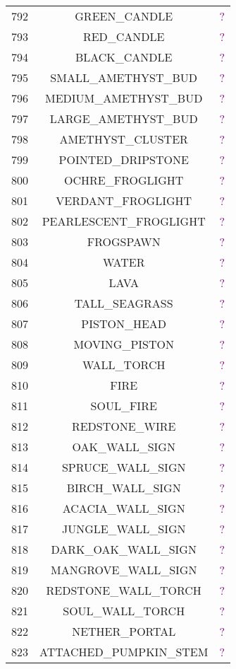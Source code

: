 \documentclass[11pt]{article}
\newcommand\myworries[1]{\textcolor{purple}{#1}}
\begin{document}
\begin{longtable}{ |c|c|c| }
	792 & GREEN\_CANDLE & \myworries{?} \\
	793 & RED\_CANDLE & \myworries{?} \\
	794 & BLACK\_CANDLE & \myworries{?} \\
	795 & SMALL\_AMETHYST\_BUD & \myworries{?} \\
	796 & MEDIUM\_AMETHYST\_BUD & \myworries{?} \\
	797 & LARGE\_AMETHYST\_BUD & \myworries{?} \\
	798 & AMETHYST\_CLUSTER & \myworries{?} \\
	799 & POINTED\_DRIPSTONE & \myworries{?} \\
	800 & OCHRE\_FROGLIGHT & \myworries{?} \\
	801 & VERDANT\_FROGLIGHT & \myworries{?} \\
	802 & PEARLESCENT\_FROGLIGHT & \myworries{?} \\
	803 & FROGSPAWN & \myworries{?} \\
	804 & WATER & \myworries{?} \\
	805 & LAVA & \myworries{?} \\
	806 & TALL\_SEAGRASS & \myworries{?} \\
	807 & PISTON\_HEAD & \myworries{?} \\
	808 & MOVING\_PISTON & \myworries{?} \\
	809 & WALL\_TORCH & \myworries{?} \\
	810 & FIRE & \myworries{?} \\
	811 & SOUL\_FIRE & \myworries{?} \\
	812 & REDSTONE\_WIRE & \myworries{?} \\
	813 & OAK\_WALL\_SIGN & \myworries{?} \\
	814 & SPRUCE\_WALL\_SIGN & \myworries{?} \\
	815 & BIRCH\_WALL\_SIGN & \myworries{?} \\
	816 & ACACIA\_WALL\_SIGN & \myworries{?} \\
	817 & JUNGLE\_WALL\_SIGN & \myworries{?} \\
	818 & DARK\_OAK\_WALL\_SIGN & \myworries{?} \\
	819 & MANGROVE\_WALL\_SIGN & \myworries{?} \\
	820 & REDSTONE\_WALL\_TORCH & \myworries{?} \\
	821 & SOUL\_WALL\_TORCH & \myworries{?} \\
	822 & NETHER\_PORTAL & \myworries{?} \\
	823 & ATTACHED\_PUMPKIN\_STEM & \myworries{?} \\

\end{longtable}
\end{document}
